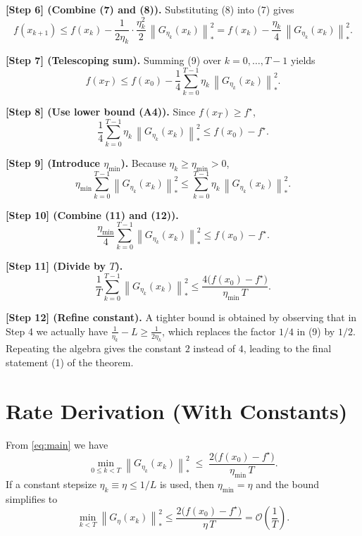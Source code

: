 \documentclass{article}
\newcommand{\norm}[1]{\left\|#1\right\|}
\begin{document}
\noindent\textbf{[Step 6] (Combine (7) and (8)).}
Substituting (8) into (7) gives
\[
f(x_{k+1})\le f(x_k)-\frac{1}{2\eta_k}\cdot\frac{\eta_k^{2}}{2}\,
\norm{G_{\eta_k}(x_k)}_{*}^{2}
= f(x_k)-\frac{\eta_k}{4}\,\norm{G_{\eta_k}(x_k)}_{*}^{2}. \tag{9}
\]

\noindent\textbf{[Step 7] (Telescoping sum).}
Summing (9) over $k=0,\dots,T-1$ yields
\[
f(x_T)\le f(x_0)-\frac{1}{4}\sum_{k=0}^{T-1}\eta_k\,\norm{G_{\eta_k}(x_k)}_{*}^{2}. \tag{10}
\]

\noindent\textbf{[Step 8] (Use lower bound (A4)).}
Since $f(x_T)\ge f^{\star}$,
\[
\frac{1}{4}\sum_{k=0}^{T-1}\eta_k\,\norm{G_{\eta_k}(x_k)}_{*}^{2}
\le f(x_0)-f^{\star}. \tag{11}
\]

\noindent\textbf{[Step 9] (Introduce $\eta_{\min}$).}
Because $\eta_k\ge\eta_{\min}>0$,
\[
\eta_{\min}\sum_{k=0}^{T-1}\norm{G_{\eta_k}(x_k)}_{*}^{2}
\le \sum_{k=0}^{T-1}\eta_k\,\norm{G_{\eta_k}(x_k)}_{*}^{2}. \tag{12}
\]

\noindent\textbf{[Step 10] (Combine (11) and (12)).}
\[
\frac{\eta_{\min}}{4}\sum_{k=0}^{T-1}\norm{G_{\eta_k}(x_k)}_{*}^{2}
\le f(x_0)-f^{\star}.
\]

\noindent\textbf{[Step 11] (Divide by $T$).}
\[
\frac{1}{T}\sum_{k=0}^{T-1}\norm{G_{\eta_k}(x_k)}_{*}^{2}
\le \frac{4\bigl(f(x_0)-f^{\star}\bigr)}{\eta_{\min}\,T}. \tag{13}
\]

\noindent\textbf{[Step 12] (Refine constant).}
A tighter bound is obtained by observing that in Step 4 we actually have
$\frac{1}{\eta_k}-L\ge\frac{1}{2\eta_k}$, which replaces the factor $1/4$ in (9) by $1/2$. Repeating the algebra gives the constant $2$ instead of $4$, leading to the final statement (1) of the theorem. \hfill\qedsymbol

\section*{Rate Derivation (With Constants)}
From \eqref{eq:main} we have
\[
\min_{0\le k<T}\norm{G_{\eta_k}(x_k)}_{*}^{2}
\;\le\;
\frac{2\bigl(f(x_0)-f^{\star}\bigr)}{\eta_{\min}\,T}.
\]
If a constant stepsize $\eta_k\equiv\eta\le 1/L$ is used, then $\eta_{\min}=\eta$ and the bound simplifies to
\[
\min_{k<T}\norm{G_{\eta}(x_k)}_{*}^{2}\le \frac{2\bigl(f(x_0)-f^{\star}\bigr)}{\eta\,T}
= \mathcal{O}\!\left(\frac{1}{T}\right).
\]

\end{document}
